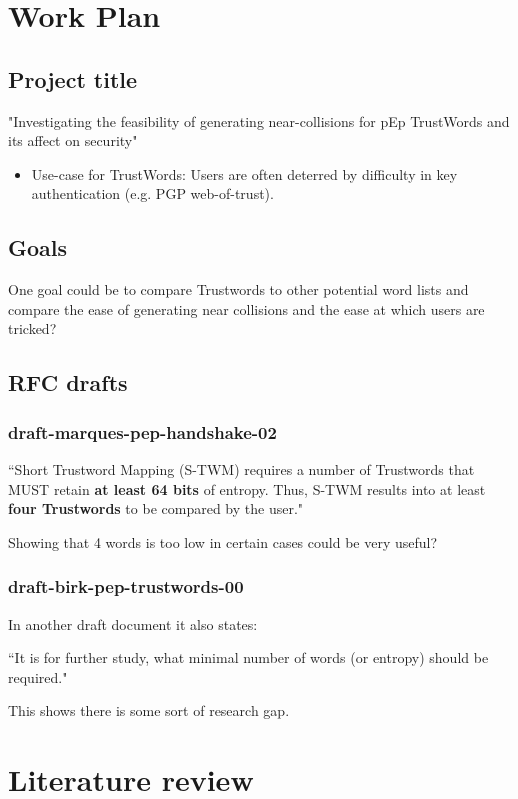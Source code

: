 \section{Work Plan}

\subsection{Project title}

"Investigating the feasibility of generating near-collisions for pEp TrustWords and its affect on security"

\begin{itemize}
    \item Use-case for TrustWords: Users are often deterred by difficulty in key authentication (e.g. PGP web-of-trust).
\end{itemize}

\subsection{Goals}

One goal could be to compare Trustwords to other potential word lists and compare the ease of generating near collisions and the ease at which users are tricked?


\subsection{RFC drafts}
\subsubsection{draft-marques-pep-handshake-02}
``Short Trustword Mapping (S-TWM) requires a number of Trustwords that MUST retain \textbf{at least 64 bits} of entropy.  Thus, S-TWM results into at least \textbf{four Trustwords} to be compared by the user."

Showing that 4 words is too low in certain cases could be very useful?

\subsubsection{draft-birk-pep-trustwords-00}
In another draft document it also states:

``It is for further study, what minimal number of words (or entropy) should be required."

This shows there is some sort of research gap.

\section{Literature review}
\label{litReview}


